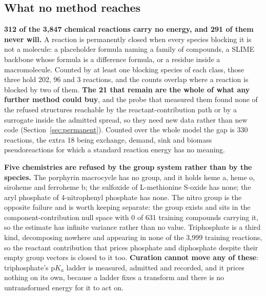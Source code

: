 \subsection{What no method reaches}
\label{sec:unreachable}


\textbf{312 of the 3{,}847 chemical reactions carry no energy, and 291 of them never will.}
A reaction is permanently closed when every species blocking it is not a molecule: a
placeholder formula naming a family of compounds, a SLIME backbone whose formula is a
difference formula, or a residue inside a macromolecule. Counted by at least one blocking
species of each class, those three hold 202, 96 and 3 reactions, and the counts overlap
where a reaction is blocked by two of them.
\textbf{The 21 that remain are the whole of what any further method could
buy}, and the probe that measured them found none of the refused structures reachable by
the reactant-contribution path or by a surrogate inside the admitted spread, so they need
new data rather than new code (Section~\ref{sec:permanent}). Counted over the whole model
the gap is 330 reactions, the extra 18 being exchange, demand, sink and biomass
pseudoreactions for which a standard reaction energy has no meaning.

\textbf{Five chemistries are refused by the group system rather than by the species.} The
porphyrin macrocycle has no group, and it holds heme a, heme o, siroheme and ferroheme b;
the sulfoxide of L-methionine S-oxide has none; the aryl phosphate of 4-nitrophenyl
phosphate has none. The nitro group is the opposite failure and is worth keeping separate:
the group exists and sits in the component-contribution null space with 0 of 631 training
compounds carrying it, so the estimate has infinite variance rather than no value.
Triphosphate is a third kind, decomposing nowhere and appearing in none of the 3{,}999
training reactions, so the reactant contribution that prices phosphate and diphosphate
despite their empty group vectors is closed to it too. \textbf{Curation cannot move any of
these}: triphosphate's p$K_a$ ladder is measured, admitted and recorded, and it prices
nothing on its own, because a ladder fixes a transform and there is no untransformed
energy for it to act on.

